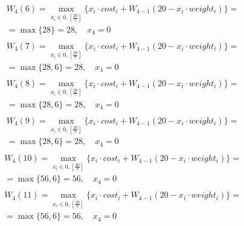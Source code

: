 \documentclass[17pt]{extarticle}
\begin{document}
\[
    \begin{aligned}
         & W_4(6)=\max_{x_i \in \overline{0, \left[\frac{20}{7}\right]}} \{x_i \cdot cost_i + W_{4-1}(20 - x_i \cdot weight_i)\}= \\& = \max \{
        28\}= 28, \quad x_4 = 0                                                                                                   \\
    \end{aligned}
\]
\[
    \begin{aligned}
         & W_4(7)=\max_{x_i \in \overline{0, \left[\frac{20}{7}\right]}} \{x_i \cdot cost_i + W_{4-1}(20 - x_i \cdot weight_i)\}= \\& = \max \{
        28, 6\}= 28, \quad x_4 = 0                                                                                                \\
    \end{aligned}
\]
\[
    \begin{aligned}
         & W_4(8)=\max_{x_i \in \overline{0, \left[\frac{20}{7}\right]}} \{x_i \cdot cost_i + W_{4-1}(20 - x_i \cdot weight_i)\}= \\& = \max \{
        28, 6\}= 28, \quad x_4 = 0                                                                                                \\
    \end{aligned}
\]
\[
    \begin{aligned}
         & W_4(9)=\max_{x_i \in \overline{0, \left[\frac{20}{7}\right]}} \{x_i \cdot cost_i + W_{4-1}(20 - x_i \cdot weight_i)\}= \\& = \max \{
        28, 6\}= 28, \quad x_4 = 0                                                                                                \\
    \end{aligned}
\]
\[
    \begin{aligned}
         & W_4(10)=\max_{x_i \in \overline{0, \left[\frac{20}{7}\right]}} \{x_i \cdot cost_i + W_{4-1}(20 - x_i \cdot weight_i)\}= \\& = \max \{
        56, 6\}= 56, \quad x_4 = 0                                                                                                 \\
    \end{aligned}
\]
\[
    \begin{aligned}
         & W_4(11)=\max_{x_i \in \overline{0, \left[\frac{20}{7}\right]}} \{x_i \cdot cost_i + W_{4-1}(20 - x_i \cdot weight_i)\}= \\& = \max \{
        56, 6\}= 56, \quad x_4 = 0                                                                                                 \\
    \end{aligned}
\]
\end{document}
